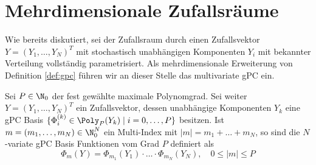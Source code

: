 \section{Mehrdimensionale Zufallsräume}
Wie bereits diskutiert, sei der Zufallsraum durch einen Zufallsvektor $Y=(Y_1,\dots,Y_N)^T$ mit stochastisch unabhängigen Komponenten $Y_i$ mit bekannter Verteilung vollständig parametrisiert. Als mehrdimensionale Erweiterung von Definition \ref{def:gpc} führen wir an dieser Stelle das multivariate gPC ein.
\begin{mathdef}
Sei $P\in\N_0$ der fest gewählte maximale Polynomgrad. Sei weiter $Y=(Y_1,\dots,Y_N)^T$ ein Zufallsvektor, dessen unabhängige Komponenten $Y_k$ eine gPC Basis $\lbrace \Phi_i^{(k)}\in\Poly_P(Y_k)\mid i=0,\dots,P\rbrace$ besitzen. Ist $m=(m_1,\dots,m_N)\in\N_0^N$ ein Multi-Index mit $|m|=m_1+\dots+m_N$, so sind die $N$-variate gPC Basis Funktionen vom Grad $P$ definiert als 
\[\Phi_m(Y)=\Phi_{m_1}(Y_1)\cdot\ldots\cdot\Phi_{m_N}(Y_N),\quad 0\le |m|\le P\]
\end{mathdef}

